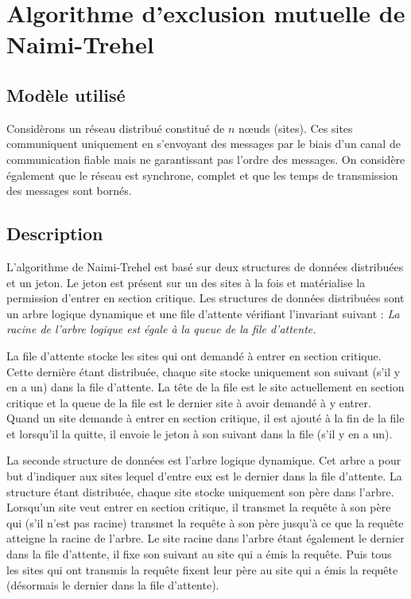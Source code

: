 
\chapter{Algorithme d'exclusion mutuelle de Naimi-Trehel}\label{naimi-trehel}

\section{Modèle utilisé}
Considèrons un réseau distribué constitué de $n$ nœuds (sites). Ces sites communiquent uniquement en s'envoyant des messages par le biais d'un canal de communication fiable mais ne garantissant pas l'ordre des messages. On considère également que le réseau est synchrone, complet et que les temps de transmission des messages sont bornés.

\section{Description}
L'algorithme de Naimi-Trehel \cite{naimi1996} est basé sur deux structures de données distribuées
 et un jeton. Le jeton est présent sur un des sites à la fois et matérialise la permission d'entrer
 en section critique. Les structures de données distribuées sont un arbre logique dynamique et une
 file d'attente vérifiant l'invariant suivant : \emph{La racine de l'arbre logique est égale à la
 queue de la file d'attente.}

La file d'attente stocke les sites qui ont demandé à entrer en section critique. Cette dernière
étant distribuée, chaque site stocke uniquement son suivant (s'il y en a un) dans la file d'attente.
La tête de la file est le site actuellement en section critique et la queue de la file est le
dernier site à avoir demandé à y entrer. Quand un site demande à entrer en section critique, il est
ajouté à la fin de la file et lorsqu'il la quitte, il envoie le jeton à son
suivant dans la file (s'il y en a un).

La seconde structure de données est l'arbre logique dynamique. Cet arbre a pour but d'indiquer aux sites lequel d'entre eux est le dernier dans la file d'attente. La structure étant distribuée, chaque site stocke uniquement son père dans l'arbre. Lorsqu'un site veut entrer en section critique, il transmet la requête à son père qui (s'il n'est pas racine) transmet la requête à son père jusqu'à ce que la requête atteigne la racine de l'arbre. Le site racine dans l'arbre étant également le dernier dans la file d'attente, il fixe son suivant au site qui a émis la requête. Puis tous les sites qui ont transmis la requête fixent leur père au site qui a émis la requête (désormais le dernier dans la file d'attente).


